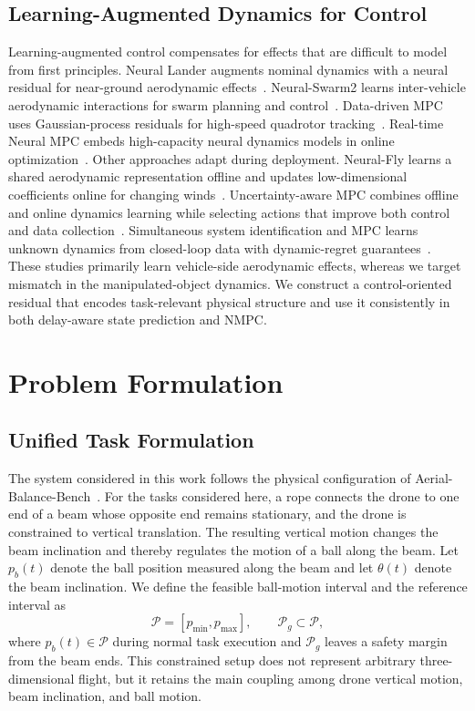 \documentclass[letterpaper, 10 pt, conference]{ieeeconf}  %
\begin{document}
\subsection{Learning-Augmented Dynamics for Control}
Learning-augmented control compensates for effects that are difficult to model from first principles. Neural
Lander augments nominal dynamics with a neural residual for near-ground aerodynamic effects~\cite{shi2019neural}.
Neural-Swarm2 learns inter-vehicle aerodynamic interactions for swarm planning and
control~\cite{shi2021neural}. Data-driven MPC uses Gaussian-process residuals for high-speed quadrotor
tracking~\cite{torrente2021data}. Real-time Neural MPC embeds high-capacity neural dynamics models in online
optimization~\cite{salzmann2023real}. Other approaches adapt during deployment. Neural-Fly learns a shared
aerodynamic representation offline and updates low-dimensional coefficients online for changing
winds~\cite{o2022neural}. Uncertainty-aware MPC combines offline and online dynamics learning while selecting
actions that improve both control and data collection~\cite{saviolo2023active}. Simultaneous system identification
and MPC learns unknown dynamics from closed-loop data with dynamic-regret guarantees~\cite{zhou2025simultaneous}.
These studies primarily learn vehicle-side aerodynamic effects, whereas we target mismatch in the
manipulated-object dynamics. We construct a control-oriented residual that encodes task-relevant physical
structure and use it consistently in both delay-aware state prediction and NMPC.


\section{Problem Formulation}
\label{sec:problem_formulation}
\subsection{Unified Task Formulation}
The system considered in this work follows the physical configuration of
Aerial-Balance-Bench~\cite{liu2026aerialBalanceBench}. For the tasks considered here, a rope connects the drone to
one end of a beam whose opposite end remains stationary, and the drone is constrained to vertical translation.
The resulting vertical motion changes the beam inclination and thereby regulates the
motion of a ball along the beam. Let $p_b(t)$ denote
the ball position measured along the beam and let $\theta(t)$ denote the beam inclination. We define the feasible
ball-motion interval and the reference interval as
\begin{equation}
    \mathcal{P}=[p_{\min},p_{\max}], \qquad
    \mathcal{P}_g\subset\mathcal{P},
    \label{eq:feasible_ball_interval}
\end{equation}
where $p_b(t)\in\mathcal{P}$ during normal task execution and $\mathcal{P}_g$ leaves a safety margin from the beam
ends. This constrained setup does not represent arbitrary three-dimensional flight, but it retains the main
coupling among drone vertical motion, beam inclination, and ball motion.
\end{document}
